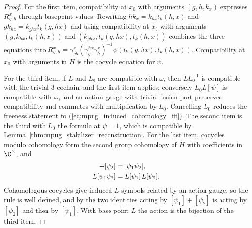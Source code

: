 \begin{proof}\leanok
    For the first item, compatibility at $x_0$ with arguments
    $(g,h,k_x)$ expresses $R^x_{g,h}$ through basepoint values. Rewriting
    $hk_x=k_{hx}t_k(h,x)$ and $gk_{hx}=k_{ghx}t_k(g,hx)$ and using
    compatibility at $x_0$ with arguments $(g,k_{hx},t_k(h,x))$ and
    $(k_{ghx},t_k(g,hx),t_k(h,x))$ combines the three equations into
    $R^x_{g,h}=\gamma^x_{gh}(\gamma^{hx}_g\gamma^x_h)^{-1}
        \psi(t_k(g,hx),t_k(h,x))$. Compatibility at $x_0$ with arguments in
    $H$ is the cocycle equation for $\psi$.

    For the third item, if $L$ and $L_0$ are compatible with $\omega$,
    then $LL_0^{-1}$ is compatible with the trivial $3$-cochain, and the first
    item applies; conversely $L_0L[\psi]$ is compatible with $\omega$, and an
    action gauge with trivial fusion part preserves compatibility and
    commutes with multiplication by $L_0$. Cancelling $L_0$ reduces the
    freeness statement to (\ref{eq:mpug_induced_cohomology_iff}). The second
    item is the third with $L_0$ the formula at $\psi=1$, which is
    compatible by Lemma~\ref{thm:mpug_stabilizer_reconstruction}.
    For the last item, cocycles modulo cohomology form the second group
    cohomology of $H$ with coefficients in $\C^\times$, and
    \begin{align}
        [\psi_1]+[\psi_2] & =[\psi_1\psi_2],
        \notag                                     \\
        L[\psi_1\psi_2]   & =L[\psi_1]\,L[\psi_2].
        \notag
    \end{align}
    Cohomologous cocycles give induced $L$-symbols related by an action
    gauge, so the rule is well defined, and by the two identities acting by
    $[\psi_1]+[\psi_2]$ is acting by $[\psi_2]$ and then by $[\psi_1]$. With
    base point $L$ the action is the bijection of the third item.
\end{proof}

